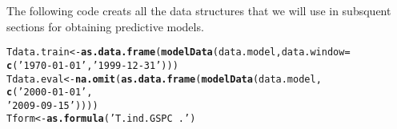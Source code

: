 \documentclass{article}\usepackage[]{graphicx}\usepackage[]{color}
\makeatletter
\newcommand{\hlstr}[1]{\textcolor[rgb]{0.192,0.494,0.8}{#1}}%
\newcommand{\hlstd}[1]{\textcolor[rgb]{0.345,0.345,0.345}{#1}}%
\newcommand{\hlkwb}[1]{\textcolor[rgb]{0.69,0.353,0.396}{#1}}%
\newcommand{\hlkwc}[1]{\textcolor[rgb]{0.333,0.667,0.333}{#1}}%
\newcommand{\hlkwd}[1]{\textcolor[rgb]{0.737,0.353,0.396}{\textbf{#1}}}%
\newenvironment{kframe}{%
 \def\at@end@of@kframe{}%
 \ifinner\ifhmode%
  \def\at@end@of@kframe{\end{minipage}}%
  \begin{minipage}{\columnwidth}%
 \fi\fi%
 \def\FrameCommand##1{\hskip\@totalleftmargin \hskip-\fboxsep
 \colorbox{shadecolor}{##1}\hskip-\fboxsep
     \hskip-\linewidth \hskip-\@totalleftmargin \hskip\columnwidth}%
 \MakeFramed {\advance\hsize-\width
   \@totalleftmargin\z@ \linewidth\hsize
   \@setminipage}}%
 {\par\unskip\endMakeFramed%
 \at@end@of@kframe}
\newenvironment{knitrout}{}{} %
\makeatother
\begin{document}
The following code creats all the data structures that we will use in subsquent sections for obtaining predictive models.
\begin{knitrout}
\color{fgcolor}\begin{kframe}
\begin{alltt}
\hlstd{Tdata.train} \hlkwb{<-} \hlkwd{as.data.frame}\hlstd{(}\hlkwd{modelData}\hlstd{(data.model,} \hlkwc{data.window} \hlstd{=}
                                         \hlkwd{c}\hlstd{(}\hlstr{'1970-01-01'}\hlstd{,}\hlstr{'1999-12-31'}\hlstd{)))}
\hlstd{Tdata.eval} \hlkwb{<-} \hlkwd{na.omit}\hlstd{(}\hlkwd{as.data.frame}\hlstd{(}\hlkwd{modelData}\hlstd{(data.model,}
                                               \hlkwd{c}\hlstd{(}\hlstr{'2000-01-01'}\hlstd{,}
                                                 \hlstr{'2009-09-15'}\hlstd{))))}
\hlstd{Tform} \hlkwb{<-} \hlkwd{as.formula}\hlstd{(}\hlstr{'T.ind.GSPC ~ .'}\hlstd{)}
\end{alltt}
\end{kframe}
\end{knitrout}
\end{document}
